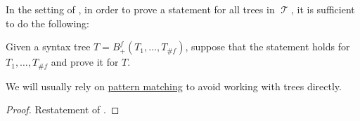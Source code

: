 \begin{theorem}\label{thm:induction_on_abstract_syntax}
  In the setting of , in order to prove a statement for all trees in \( \mscrT \), it is sufficient to do the following:
  \begin{displayquote}
    Given a syntax tree \( T = B_+^f(T_1, \ldots, T_{\# f}) \), suppose that the statement holds for \( T_1, \ldots, T_{\# f} \) and prove it for \( T \).
  \end{displayquote}
\end{theorem}
\begin{comments}
  \item We will usually rely on \hyperref[con:evaluation]{pattern matching} to avoid working with trees directly.
\end{comments}
\begin{proof}
  Restatement of .
\end{proof}
